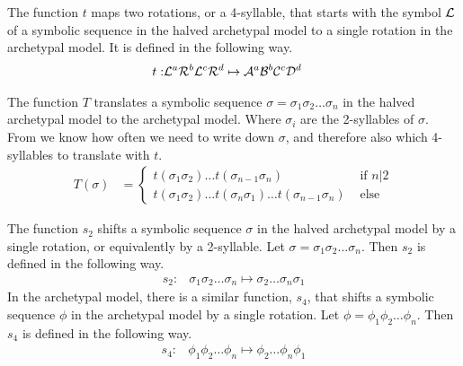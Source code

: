 \begin{definition}
	\label{def:t}
	The function $t$ maps two rotations, or a 4-syllable, that starts with the symbol $\mathcal{L}$ of a symbolic sequence in the halved archetypal model to a single rotation in the archetypal model.
	It is defined in the following way.
	\begin{align}
		t: & \mathcal{L}^a\mathcal{R}^b\mathcal{L}^c\mathcal{R}^d \mapsto \mathcal{A}^a\mathcal{B}^b\mathcal{C}^c\mathcal{D}^d
	\end{align}
\end{definition}

\begin{definition}
	\label{def:T}
	The function $T$ translates a symbolic sequence $\sigma = \sigma_1\sigma_2 \dots \sigma_n$ in the halved archetypal model to the archetypal model.
	Where $\sigma_i$ are the 2-syllables of $\sigma$.
	From  we know how often we need to write down $\sigma$, and therefore also which 4-syllables to translate with $t$.
	\begin{align}
		T(\sigma) & = \begin{cases}
			              t(\sigma_1\sigma_2) \dots t(\sigma_{n-1}\sigma_n)                           & \text{ if } n | 2 \\
			              t(\sigma_1\sigma_2) \dots t(\sigma_n\sigma_1) \dots t(\sigma_{n-1}\sigma_n) & \text{ else }
		              \end{cases}
	\end{align}
\end{definition}

\begin{definition}
	The function $s_2$ shifts a symbolic sequence $\sigma$ in the halved archetypal model by a single rotation, or equivalently by a 2-syllable.
	Let $\sigma = \sigma_1\sigma_2 \dots \sigma_n$.
	Then $s_2$ is defined in the following way.
	\begin{align}
		s_2: & \sigma_1\sigma_2 \dots \sigma_n \mapsto \sigma_2 \dots \sigma_n\sigma_1
	\end{align}
	In the archetypal model, there is a similar function, $s_4$, that shifts a symbolic sequence $\phi$ in the archetypal model by a single rotation.
	Let $\phi = \phi_1\phi_2 \dots \phi_n$.
	Then $s_4$ is defined in the following way.
	\begin{align}
		s_4: & \phi_1\phi_2 \dots \phi_n \mapsto \phi_2 \dots \phi_n\phi_1
	\end{align}
\end{definition}


